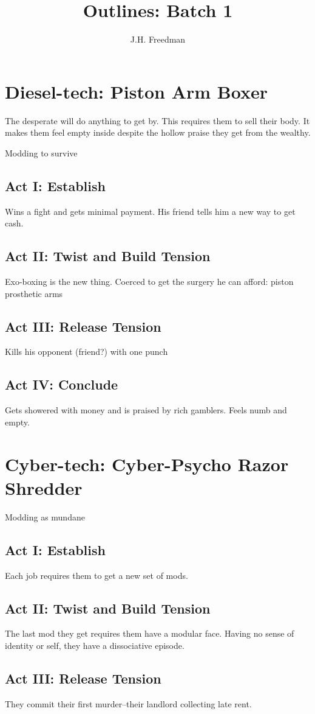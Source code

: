 \documentclass[]{article}
\title{Outlines: Batch 1}
\author{J.H. Freedman}
\begin{document}
\maketitle

\section{Diesel-tech: Piston Arm Boxer}
The desperate will do anything to get by. This requires them to sell their body. It makes them feel empty inside despite the hollow praise they get from the wealthy.

Modding to survive
\subsection*{Act I: Establish}
Wins a fight and gets minimal payment. His friend tells him a new way to get cash.
\subsection*{Act II: Twist and Build Tension}
Exo-boxing is the new thing. Coerced to get the surgery he can afford: piston prosthetic arms 
\subsection*{Act III: Release Tension}
Kills his opponent (friend?) with one punch
\subsection*{Act IV: Conclude}
Gets showered with money and is praised by rich gamblers. Feels numb and empty.

\section{Cyber-tech: Cyber-Psycho Razor Shredder}
Modding as mundane
\subsection*{Act I: Establish}
Each job requires them to get a new set of mods. 
\subsection*{Act II: Twist and Build Tension}
The last mod they get requires them have a modular face. Having no sense of identity or self, they have a dissociative episode.
\subsection*{Act III: Release Tension}
They commit their first murder--their landlord collecting late rent. 
\end{document}
